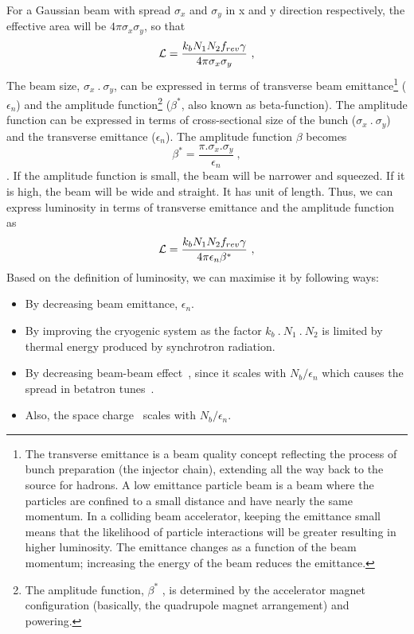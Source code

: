 For a Gaussian beam with spread $\sigma_x$ and $\sigma_y$ in x and y direction respectively, the effective area will be $4\pi \sigma_x \sigma_y$, so that
\begin{equation}\label{eq:luminosity}
    \mathcal{L} = \frac{k_bN_1N_2f_{rev}\gamma}{4 \pi \sigma_x \sigma_y}~,
\end{equation}
The beam size, $\sigma_x~.~\sigma_y$, can be expressed in terms of transverse beam emittance\footnote{The transverse emittance is a beam quality concept reflecting the process of bunch preparation (the injector chain), extending all the way back to the source for hadrons. A low emittance particle beam is a beam where the particles are confined to a small distance and have nearly the same momentum. In a colliding beam accelerator, keeping the emittance small means that the likelihood of particle interactions will be greater resulting in higher luminosity. The emittance changes as a function of the beam momentum; increasing the energy of the beam reduces the emittance.} ($\epsilon_n$) and the amplitude function\footnote{The amplitude function, $\beta^*$ , is determined by the accelerator magnet configuration (basically, the quadrupole magnet arrangement) and powering. } ($\beta^*$, also known as beta-function). The amplitude function can be expressed in terms of cross-sectional size of the bunch ($\sigma_x~.~\sigma_y$) and  the transverse emittance ($\epsilon_n$). The amplitude function $\beta$  becomes 
\begin{equation}\label{eq:beta_function}
	\beta^* = \frac{\pi.\sigma_x.\sigma_y}{\epsilon_n}~,
\end{equation}. 
If the amplitude function is small, the beam will be narrower and squeezed. If it is high, the beam will be wide and straight. It has unit of length. Thus, we can express luminosity in terms of transverse emittance and the amplitude function as
\begin{equation}\label{eq:luminosity2}
    \mathcal{L} = \frac{k_bN_1N_2f_{rev}\gamma}{4 \pi \epsilon_n \beta^*}~,
\end{equation}
Based on the definition of luminosity, we can maximise it by following ways:
\begin{itemize}
    \item By decreasing beam emittance, $\epsilon_n$.
    \item By improving the cryogenic system as the factor $k_b~.~N_1~.~N_2$ is limited by thermal energy produced by synchrotron radiation.
    \item By decreasing beam-beam effect~\cite{Herr2014,Papotti2014}, since it scales with $N_b/ \epsilon_n$ which causes the spread in betatron tunes~\cite{Dubouchet2013}.
    \item Also, the space charge~\cite{Oeftiger2016} scales with $N_b/ \epsilon_n$.
\end{itemize}

